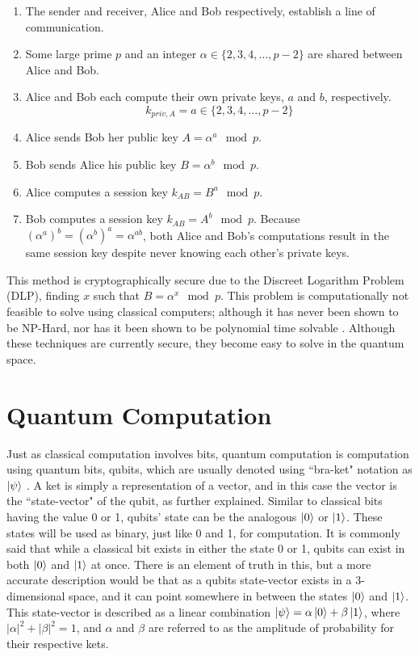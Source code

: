 \begin{enumerate}
\item The sender and receiver, Alice and Bob respectively, establish a line of communication.
\item Some large prime $p$ and an integer $\alpha \in \{2,3,4,...,p-2\}$ are shared between Alice and Bob.
\item Alice and Bob each compute their own private keys, $a$ and $b$, respectively. $$k_{priv,A} = a \in \{2,3,4,...,p-2\}$$
\item Alice sends Bob her public key $A = \alpha^a \mod p$.
\item Bob sends Alice his public key $B = \alpha^b \mod p$. 
\item Alice computes a session key $k_{AB} = B^a \mod p$.
\item Bob computes a session key $k_{AB} = A^b \mod p$. 
Because $(\alpha^a)^b = (\alpha^b)^a = \alpha^{ab}$, both Alice and Bob's computations result in the same session key despite never knowing each other's private keys. 
\end{enumerate}

This method is cryptographically secure due to the Discreet Logarithm Problem (DLP), finding $x$ such that $B = \alpha^x \mod p$. 
This problem is computationally not feasible to solve using classical computers; although it has never been shown to be NP-Hard, nor has it been shown to be polynomial time solvable \cite{Shor_1997}.
Although these techniques are currently secure, they become easy to solve in the quantum space.

\section{Quantum Computation}

Just as classical computation involves bits, quantum computation is computation using quantum bits, qubits, which are usually denoted using ``bra-ket" notation as $\ket{\psi}$ \cite{qc:agi}.
A ket is simply a representation of a vector, and in this case the vector is the ``state-vector" of the qubit, as further explained.
Similar to classical bits having the value 0 or 1, qubits' state can be the analogous $\ket{0}$ or $\ket{1}$.
These states will be used as binary, just like 0 and 1, for computation.
It is commonly said that while a classical bit exists in either the state 0 or 1, qubits can exist in both $\ket{0}$ and $\ket{1}$ at once.
There is an element of truth in this, but a more accurate description would be that as a qubits state-vector exists in a 3-dimensional space, and it can point somewhere in between the states $\ket{0}$ and $\ket{1}$. 
This state-vector is described as a linear combination $\ket{\psi} = \alpha\ket{0} + \beta\ket{1}$, where $|\alpha|^2 + |\beta|^2 = 1$, and $\alpha$ and $\beta$ are referred to as the amplitude of probability for their respective kets.


